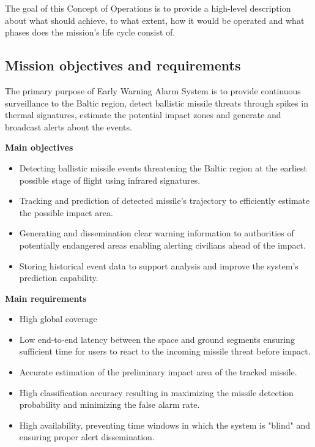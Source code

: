 The goal of this Concept of Operations is to provide a high-level description about what  should achieve, to what extent, how it would be operated and what phases does the mission's life cycle consist of. 

\subsection{Mission objectives and requirements}

The primary purpose of Early Warning Alarm System is to provide continuous surveillance to the Baltic region, detect ballistic missile threats through spikes in thermal signatures, estimate the potential impact zones and generate and broadcast alerts about the events. 

\textbf{Main objectives}

\begin{itemize}
    \item Detecting ballistic missile events threatening the Baltic region at the earliest possible stage of flight using infrared signatures. 

    \item Tracking and prediction of detected missile's trajectory to efficiently estimate the possible impact area. 

    \item Generating and dissemination clear warning information to authorities of potentially endangered areas enabling alerting civilians ahead of the impact. 

    \item Storing historical event data to support analysis and improve the system's prediction capability. 
\end{itemize}

\textbf{Main requirements}

\begin{itemize}
    \item High global coverage 
    
    \item Low end-to-end latency between the space and ground segments ensuring sufficient time for users to react to the incoming missile threat before impact. 

    \item Accurate estimation of the preliminary impact area of the tracked missile. 

    \item High classification accuracy resulting in maximizing the missile detection probability and minimizing the false alarm rate. 

    \item High availability, preventing time windows in which the system is "blind" and ensuring proper alert dissemination. 
\end{itemize}

